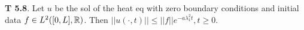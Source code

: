 {\bf T 5.8}. Let $u$ be the sol of the heat eq with zero boundary conditions and initial data $f \in L^2([0,L],\mathbb{R})$. Then $||u(\cdot, t)|| \leq ||f||e^{-a\lambda_1^2 t}, t \geq 0$. 
